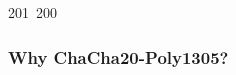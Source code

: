201~200~\documentclass{article}
\begin{document}
	                                                                                                                                                                                                                                                                                                	                                                                                                                                        	    	                                                                                                	                                                                                                                                                                                                                                                                                                                                	                                                                        	                                                                        	                                                                                                                                        	                                                                                                                                                                                                                        	                                                                                                                            	                                                                	                                                                                                                                                                                                \subsubsection{Why ChaCha20-Poly1305?}
\end{document}
